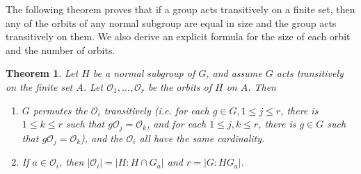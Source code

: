 \documentclass[12pt]{article}
\newtheorem{thm}{Theorem}
\begin{document}
The following theorem proves that if a group acts transitively on a finite set, then any of the orbits of any normal subgroup are equal in size and the group acts transitively on them. We also derive an explicit formula for the size of each orbit and the number of orbits.

\begin{thm} Let $H$ be a normal subgroup of $G$, and assume $G$ acts transitively on the finite set $A$. Let $\mathcal{O}_1, \ldots,\mathcal{O}_r$ be the orbits of $H$ on $A$. Then
\begin{enumerate}
\item $G$ permutes the $\mathcal{O}_i$ transitively (i.e. for each $g\in G, 1\leq j\leq r$, there is $1\leq k\leq r$ such that $g\mathcal{O}_j=\mathcal{O}_k$, and for each $1\leq j,k\leq r$, there is $g\in G$ such that $g\mathcal{O}_j=\mathcal{O}_k$), and the $\mathcal{O}_i$ all have the same cardinality.
\item If $a\in \mathcal{O}_i$, then $\lvert\mathcal{O}_i\rvert=\lvert H: H\cap G_a\rvert$ and $r=\lvert G:HG_a\rvert$.
\end{enumerate}
\end{thm}
\end{document}
